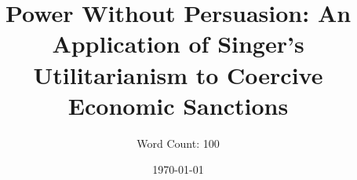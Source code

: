 \documentclass[12pt]{article}
\title{Power Without Persuasion: An Application of Singer's Utilitarianism to Coercive Economic Sanctions}
\author{Word Count: 100}
\date{\today}
\begin{document}
\maketitle

\Blindtext

\end{document}
